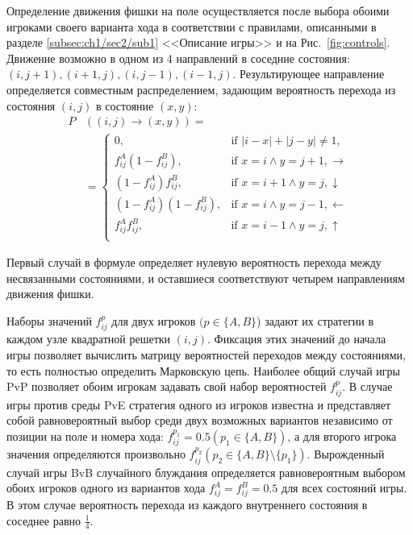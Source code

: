 Определение движения фишки на поле осуществляется после выбора обоими игроками своего варианта хода в соответствии с правилами,
описанными в разделе \cref{subsec:ch1/sec2/sub1} <<Описание игры>> и на Рис.~\cref{fig:controls}. 
Движение возможно в одном из 4 направлений в соседние состояния:
$(i, j + 1), (i + 1, j), (i, j - 1), (i - 1, j)$. Результирующее направление определяется совместным распределением, 
задающим вероятность перехода из состояния $(i, j)$ в состояние $(x, y)$:
\begin{equation}
    \begin{aligned}
    P& \left( (i, j) \rightarrow (x, y) \right) = \\
    &=\begin{cases}
        0, &\mbox{if } |i-x|+|j-y| \neq 1,\\ 
        f_{ij}^A \left(1-f_{ij}^B\right), &\mbox{if } x=i \land y=j+1, \boldsymbol{\rightarrow}\\
        \left(1-f_{ij}^A\right) f_{ij}^B, &\mbox{if } x=i+1 \land y=j, \boldsymbol{\downarrow}\\
        \left(1-f_{ij}^A\right) \left(1-f_{ij}^B\right), &\mbox{if } x=i \land y=j-1, \boldsymbol{\leftarrow}\\
        f_{ij}^A f_{ij}^B, &\mbox{if } x=i-1 \land y=j, \boldsymbol{\uparrow}\\
    \end{cases}
    \label{eq:transition}
    \end{aligned}
\end{equation}

Первый случай в формуле определяет нулевую вероятность перехода между несвязанными состояниями, и оставшиеся соответствуют четырем направлениям движения фишки.

Наборы значений $f_{ij}^p$ для двух игроков $(p \in \{A, B\}$) задают их стратегии в каждом узле квадратной решетки $(i, j)$. 
Фиксация этих значений до начала игры позволяет вычислить матрицу вероятностей переходов между состояниями, то есть полностью определить Марковскую цепь.
Наиболее общий случай игры PvP позволяет обоим игрокам задавать свой набор вероятностей $f_{ij}^p$. В случае игры против среды PvE
стратегия одного из игроков известна и представляет собой равновероятный выбор среди двух возможных вариантов независимо от позиции на поле и номера хода:
$f_{ij}^{p_1} = 0.5 (p_1 \in \{A, B\})$, а для второго игрока значения определяются произвольно $f_{ij}^{p_2} (p_2 \in \{A, B\} \setminus \{p_1\})$. 
Вырожденный случай игры BvB случайного блуждания определяется равновероятным выбором обоих игроков одного из вариантов хода $f_{ij}^{A} = f_{ij}^{B} = 0.5$
для всех состояний игры. В этом случае вероятность перехода из каждого внутреннего состояния в соседнее равно $\frac{1}{4}$.

